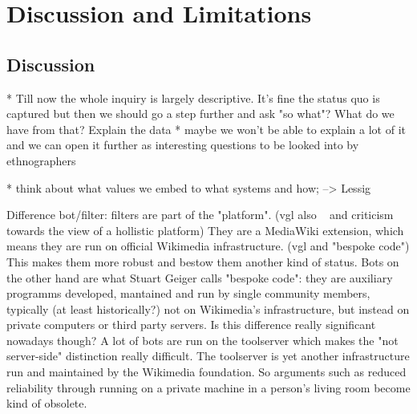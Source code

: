 \chapter{Discussion and Limitations}
\label{chap:discussion}

\section{Discussion}

* Till now the whole inquiry is largely descriptive. It's fine the status quo is captured but then we should go a step further and ask "so what"? What do we have from that? Explain the data
  * maybe we won't be able to explain a lot of it and we can open it further as interesting questions to be looked into by ethnographers

* think about what values we embed to what systems and how; --> Lessig

Difference bot/filter: filters are part of the "platform". (vgl also ~\cite{Geiger2014} and criticism towards the view of a hollistic platform)
They are a MediaWiki extension, which means they are run on official Wikimedia infrastructure. (vgl \cite{Geiger2014} and "bespoke code")
This makes them more robust and bestow them another kind of status.
Bots on the other hand are what Stuart Geiger calls "bespoke code": they are auxiliary programms developed, mantained and run by single community members, typically (at least historically?) not on Wikimedia's infrastructure, but instead on private computers or third party servers.
Is this difference really significant nowadays though? A lot of bots are run on the toolserver which makes the "not server-side" distinction really difficult.
The toolserver is yet another infrastructure run and maintained by the Wikimedia foundation.
So arguments such as reduced reliability through running on a private machine in a person's living room become kind of obsolete.
\begin{comment}
\cite{Geiger2014}
"What if, from the beginning, I had decided to run my bot on the toolserver, a
shared server funded and maintained by a group of German Wikipedians for all kinds of pur-
poses, including bots? If so, the bot may have run the same code in the same way, producing
the same effects in Wikipedia, but it would have been a different thing entirely."
"when life got in the way, it was something I literally pulled the plug on
without so much as a second thought."
\end{comment}

